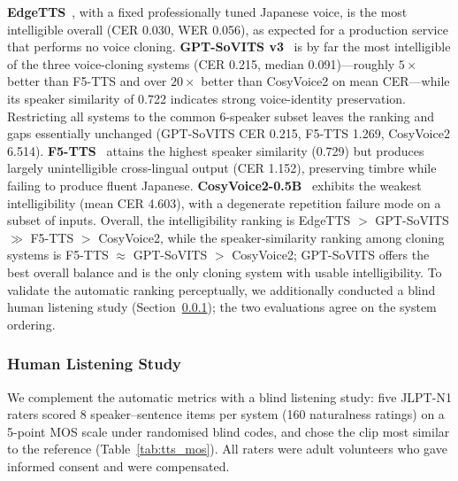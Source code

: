 \documentclass[mathematics,article,submit,xetex,moreauthors]{Definitions/mdpi}
\begin{document}
\textbf{EdgeTTS}~\cite{edgetts2024}, with a fixed professionally tuned Japanese voice, is the most intelligible overall (CER 0.030, WER 0.056), as expected for a production service that performs no voice cloning.
\textbf{GPT-SoVITS v3}~\cite{gptsovits2024} is by far the most intelligible of the three voice-cloning systems (CER 0.215, median 0.091)---roughly $5\times$ better than F5-TTS and over $20\times$ better than CosyVoice2 on mean CER---while its speaker similarity of 0.722 indicates strong voice-identity preservation.
Restricting all systems to the common 6-speaker subset leaves the ranking and gaps essentially unchanged (GPT-SoVITS CER 0.215, F5-TTS 1.269, CosyVoice2 6.514).
\textbf{F5-TTS}~\cite{chen2024f5tts} attains the highest speaker similarity (0.729) but produces largely unintelligible cross-lingual output (CER 1.152), preserving timbre while failing to produce fluent Japanese.
\textbf{CosyVoice2-0.5B}~\cite{cosyvoice2_2024} exhibits the weakest intelligibility (mean CER 4.603), with a degenerate repetition failure mode on a subset of inputs.
Overall, the intelligibility ranking is EdgeTTS $>$ GPT-SoVITS $\gg$ F5-TTS $>$ CosyVoice2, while the speaker-similarity ranking among cloning systems is F5-TTS $\approx$ GPT-SoVITS $>$ CosyVoice2; GPT-SoVITS offers the best overall balance and is the only cloning system with usable intelligibility.
To validate the automatic ranking perceptually, we additionally conducted a blind human listening study (Section~\ref{sec:tts_human}); the two evaluations agree on the system ordering.

\subsubsection{Human Listening Study}
\label{sec:tts_human}
We complement the automatic metrics with a blind listening study: five JLPT-N1 raters scored 8 speaker--sentence items per system (160 naturalness ratings) on a 5-point MOS scale under randomised blind codes, and chose the clip most similar to the reference (Table~\ref{tab:tts_mos}). All raters were adult volunteers who gave informed consent and were compensated.
\end{document}

